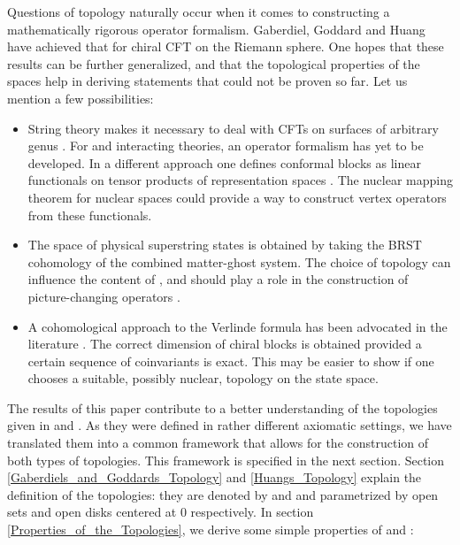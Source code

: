 \documentclass[a4paper,12pt,twoside]{article}
\renewcommand{\c}[1]{{\cal #1}}
\providecommand{\bC}{\mathbbm{C}}
\providecommand{\cT}{{\cal T}}
\renewcommand{\O}{\c{O}}
\providecommand{\D}{\c{D}}
\providecommand{\Hu}{{\rm Hu}}
\providecommand{\GG}{{\rm GG}}
\providecommand{\THud}{\cT_{\Hu}^{\D}}
\providecommand{\TGG}{\cT_{\GG}^{\O}}
\begin{document}
Questions of topology
naturally occur when it
comes to constructing a mathematically rigorous operator formalism.
Gaberdiel, Goddard and Huang have achieved that for chiral CFT on
the Riemann sphere. One hopes that these results can be
further generalized, and that the topological properties of the
spaces help in deriving statements that could not be proven so
far. Let us mention a few possibilities:
\begin{itemize}
\item
String theory makes it necessary to deal with CFTs on surfaces of
arbitrary genus \coordHE{}. For \coordHE{} and interacting theories,
an operator formalism has yet to be developed.
In a different approach one defines conformal blocks as
linear functionals on tensor products of representation spaces \cite{Frenkel}.
The nuclear mapping theorem for nuclear spaces could
provide a way to construct vertex operators from these functionals.
\item
The space of physical superstring states \coordHE{} is obtained by
taking the BRST cohomology of the combined matter-ghost system.
The choice of topology can influence
the content of \coordHE{}, and should
play a role in the construction of picture-changing operators \cite{Berkovits}.
\item
A cohomological approach to the Verlinde formula has been advocated in
the literature \cite{Teleman,Fuchs2}.
The correct dimension of chiral blocks
is obtained provided a certain sequence of coinvariants is exact.
This may be easier to show if one chooses a suitable, possibly nuclear,
topology on the state space.
\end{itemize}
The results of this paper contribute to a
better understanding of the topologies given in
\cite{Gaberdiel} and \cite{Huang}. As they were defined
in rather different axiomatic settings, we have translated
them into a
common framework that allows for the construction of both types of topologies. This
framework is specified in the next section. Section
\ref{Gaberdiels_and_Goddards_Topology} and \ref{Huangs_Topology} explain the definition
of the topologies: they are denoted by \myHighlight{$\TGG$}\coordHE{} and \myHighlight{$\THud$}\coordHE{} and parametrized by open sets
\myHighlight{$\O\subset\bC$}\coordHE{} and open disks \myHighlight{$\D\subset\bC$}\coordHE{} centered at 0 respectively.
In section \ref{Properties_of_the_Topologies}, we derive some
simple properties of \myHighlight{$\TGG$}\coordHE{} and \myHighlight{$\THud$}\coordHE{}:
\end{document}

